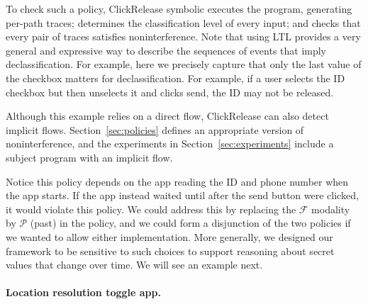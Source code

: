\documentclass{llncs}
\newcommand{\toolname}{ClickRelease\xspace}
\newcommand{\tfuture}{\mathcal{F}}
\newcommand{\tpast}{\mathcal{P}}
\begin{document}
To check such a policy, \toolname{} symbolic executes the program,
generating per-path traces; determines the classification level of every input; and
checks that every pair of traces satisfies noninterference.
Note that using LTL provides a very general and
expressive way to describe the sequences of events that imply
declassification. For example, here we precisely capture that
only the last value of the checkbox matters for declassification. For
example, if a user selects the ID checkbox but then unselects it
and clicks send, the ID may not be released.

Although this example relies on a direct flow, \toolname{} can also
detect implicit flows. Section~\ref{sec:policies} defines an
appropriate version of noninterference, and the experiments in
Section~\ref{sec:experiments} include a subject program with an
implicit flow.



Notice this policy depends on the app reading the ID
and phone number when the app starts. If the app instead
waited until after the send button were clicked, it would violate this
policy. We could address this by replacing the $\tfuture$ modality by
$\tpast$ (past) in the policy, and we could form a disjunction of the
two policies if we wanted to allow either implementation. More generally, we
designed our framework to be sensitive to such choices to
support  reasoning about secret
values that change over time. We will see an
example next.

\paragraph*{Location resolution toggle app.}
\end{document}
